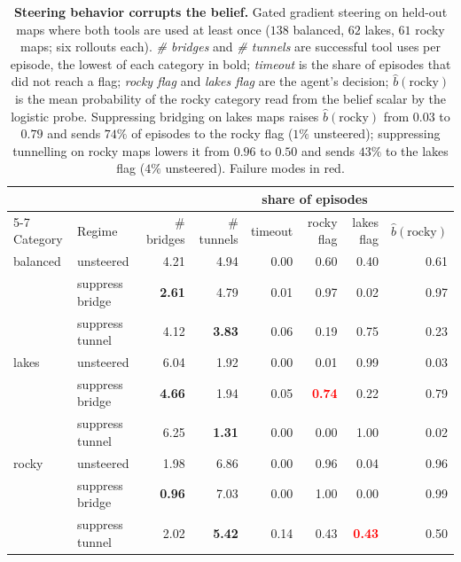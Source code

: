 \begin{table}[h!]
\centering
\small
\setlength{\tabcolsep}{6pt}
\caption{\textbf{Steering behavior corrupts the belief.} Gated gradient
steering on held-out maps where both tools are used at least once ($138$
balanced, $62$ lakes, $61$ rocky maps; six rollouts each). \emph{\# bridges}
and \emph{\# tunnels} are successful tool uses per episode, the lowest of
each category in bold; \emph{timeout} is the share of episodes that did not
reach a flag; \emph{rocky flag} and \emph{lakes flag} are the agent's
decision; $\hat b(\text{rocky})$ is the mean probability of the rocky category
read from the belief scalar by the logistic probe. Suppressing bridging on
lakes maps raises $\hat b(\text{rocky})$ from $0.03$ to $0.79$ and sends
$74\%$ of episodes to the rocky flag ($1\%$ unsteered); suppressing tunnelling
on rocky maps lowers it from $0.96$ to $0.50$ and sends $43\%$ to the lakes
flag ($4\%$ unsteered). Failure modes in red.}
\label{tab:clamp_all}
\begin{tabular}{@{}llrrrrrr@{}}
\toprule
& & & & \multicolumn{3}{c}{share of episodes} & \\
\cmidrule(lr){5-7}
Category & Regime & \# bridges & \# tunnels & timeout & rocky flag & lakes flag & $\hat b(\text{rocky})$ \\
\midrule
balanced & unsteered & 4.21 & 4.94 & 0.00 & 0.60 & 0.40 & 0.61 \\
 & suppress bridge & \textbf{2.61} & 4.79 & 0.01 & 0.97 & 0.02 & 0.97 \\
 & suppress tunnel & 4.12 & \textbf{3.83} & 0.06 & 0.19 & 0.75 & 0.23 \\
\midrule
lakes & unsteered & 6.04 & 1.92 & 0.00 & 0.01 & 0.99 & 0.03 \\
 & suppress bridge & \textbf{4.66} & 1.94 & 0.05 & \textcolor{red}{\textbf{0.74}} & 0.22 & 0.79 \\
 & suppress tunnel & 6.25 & \textbf{1.31} & 0.00 & 0.00 & 1.00 & 0.02 \\
\midrule
rocky & unsteered & 1.98 & 6.86 & 0.00 & 0.96 & 0.04 & 0.96 \\
 & suppress bridge & \textbf{0.96} & 7.03 & 0.00 & 1.00 & 0.00 & 0.99 \\
 & suppress tunnel & 2.02 & \textbf{5.42} & 0.14 & 0.43 & \textcolor{red}{\textbf{0.43}} & 0.50 \\
\bottomrule
\end{tabular}
\end{table}
